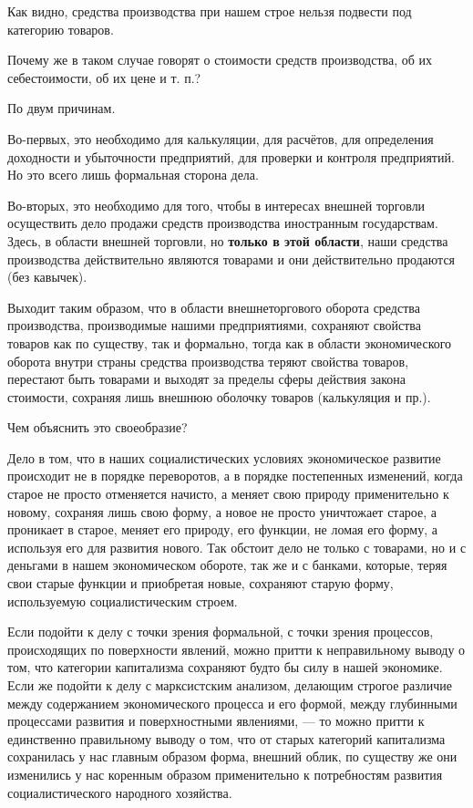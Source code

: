 \documentclass[12pt, a4paper, openany]{book}
\begin{document}
Как видно, средства производства при нашем строе нельзя подвести под категорию товаров.



Почему же в таком случае говорят о стоимости средств производства, об их себестоимости, об их цене и т. п.?



По двум причинам.



Во-первых, это необходимо для калькуляции, для расчётов, для определения доходности и убыточности предприятий, для проверки и контроля предприятий. Но это всего лишь формальная сторона дела.



Во-вторых, это необходимо для того, чтобы в интересах внешней торговли осуществить дело продажи средств производства иностранным государствам. Здесь, в области внешней торговли, но \textbf{только в этой области}, наши средства производства действительно являются товарами и они действительно продаются (без кавычек).



Выходит таким образом, что в области внешнеторгового оборота средства производства, производимые нашими предприятиями, сохраняют свойства товаров как по существу, так и формально, тогда как в области экономического оборота внутри страны средства производства теряют свойства товаров, перестают быть товарами и выходят за пределы сферы действия закона стоимости, сохраняя лишь внешнюю оболочку товаров (калькуляция и пр.).



Чем объяснить это своеобразие?



Дело в том, что в наших социалистических условиях экономическое развитие происходит не в порядке переворотов, а в порядке постепенных изменений, когда старое не просто отменяется начисто, а меняет свою природу применительно к новому, сохраняя лишь свою форму, а новое не просто уничтожает старое, а проникает в старое, меняет его природу, его функции, не ломая его форму, а используя его для развития нового. Так обстоит дело не только с товарами, но и с деньгами в нашем экономическом обороте, так же и с банками, которые, теряя свои старые функции и приобретая новые, сохраняют старую форму, используемую социалистическим строем.



Если подойти к делу с точки зрения формальной, с точки зрения процессов, происходящих по поверхности явлений, можно притти к неправильному выводу о том, что категории капитализма сохраняют будто бы силу в нашей экономике. Если же подойти к делу с марксистским анализом, делающим строгое различие между содержанием экономического процесса и его формой, между глубинными процессами развития и поверхностными явлениями, — то можно притти к единственно правильному выводу о том, что от старых категорий капитализма сохранилась у нас главным образом форма, внешний облик, по существу же они изменились у нас коренным образом применительно к потребностям развития социалистического народного хозяйства.
\end{document}
